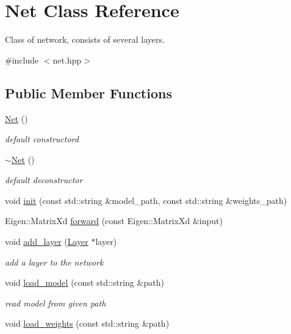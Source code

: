 \hypertarget{class_net}{}\section{Net Class Reference}
\label{class_net}


Class of network, consists of several layers.  




{\ttfamily \#include $<$net.\+hpp$>$}

\subsection*{Public Member Functions}
\begin{DoxyCompactItemize}
\item 
\hyperlink{class_net_aaad4df79dedd0dda74f7b9c061867338}{Net} ()
\begin{DoxyCompactList}\small\item\em default constructord \end{DoxyCompactList}\item 
\hyperlink{class_net_a517bf56cd781eafd5c7aabeca60b62b0}{$\sim$\+Net} ()
\begin{DoxyCompactList}\small\item\em default deconstructor \end{DoxyCompactList}\item 
void \hyperlink{class_net_a06cad1a8b674f37f82b9c818c5a2845d}{init} (const std\+::string \&model\+\_\+path, const std\+::string \&weights\+\_\+path)
\item 
Eigen\+::\+Matrix\+Xd \hyperlink{class_net_a0e710c3df8334ac43caa4693ce464546}{forward} (const Eigen\+::\+Matrix\+Xd \&input)
\item 
void \hyperlink{class_net_a81fa2c630d567b85e94a3ed007072007}{add\+\_\+layer} (\hyperlink{class_layer}{Layer} $\ast$layer)
\begin{DoxyCompactList}\small\item\em add a layer to the network \end{DoxyCompactList}\item 
void \hyperlink{class_net_a1ff26f5a15009acc7e093a27a076b374}{load\+\_\+model} (const std\+::string \&path)
\begin{DoxyCompactList}\small\item\em read model from given path \end{DoxyCompactList}\item 
void \hyperlink{class_net_a1d6d76c2c860f5dde0438b65d3b60d2e}{load\+\_\+weights} (const std\+::string \&path)

\end{DoxyCompactItemize}
